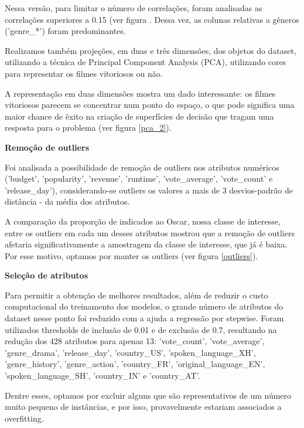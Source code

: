             Nessa versão, para limitar o número de correlações, foram analisadas as correlações superiores a 0.15 (ver figura . Dessa vez, as colunas relativas a gêneros ('genre\_*') foram predominantes.

            Realizamos também projeções, em duas e três dimensões, dos objetos do dataset, utilizando a técnica de Principal Component Analysis (PCA), utilizando cores para representar os filmes vitoriosos ou não.
            
            A representação em duas dimensões mostra um dado interessante: os filmes vitoriosos parecem se concentrar num ponto do espaço, o que pode significa uma maior chance de êxito na criação de superfícies de decisão que tragam uma resposta para o problema (ver figura \ref{pca_2}).
            
            \textbf{Remoção de outliers}\par
            Foi analisada a possibilidade de remoção de outliers nos atributos numéricos ('budget', 'popularity', 'revenue', 'runtime', 'vote\_average', 'vote\_count' e 'release\_day'), considerando-se outliers os valores a mais de 3 desvios-padrão de distância - da média dos atributos.\par
            
            A comparação da proporção de indicados ao Oscar, nossa classe de interesse, entre os outliers em cada um desses atributos mostrou que a remoção de outliers afetaria significativamente a amostragem da classe de interesse, que já é baixa. Por esse motivo, optamos por manter os outliers (ver figura \ref{outliers}).

            \textbf{Seleção de atributos}\par
            
            Para permitir a obtenção de melhores resultados, além de reduzir o custo computacional do treinamento dos modelos, o grande número de atributos do dataset nesse ponto foi reduzido com a ajuda a regressão por stepwise. Foram utilizados thresholds de inclusão de 0.01 e de exclusão de 0.7, resultando na redução dos 428 atributos para apenas 13: 'vote\_count', 'vote\_average', 'genre\_drama', 'release\_day', 'country\_US', 'spoken\_language\_XH', 'genre\_history', 'genre\_action', 'country\_FR', 'original\_language\_EN', 'spoken\_language\_SH', 'country\_IN' e 'country\_AT'.
            
            Dentre esses, optamos por excluir alguns que são representativos de um número muito pequeno de instâncias, e por isso, provavelmente estariam associados a overfitting.\newline

